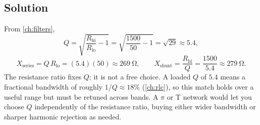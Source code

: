 \subsection*{Solution}
From \cref{ch:filters},
\[
Q=\sqrt{\frac{R_{\text{hi}}}{R_{\text{lo}}}-1}=\sqrt{\frac{1500}{50}-1}=\sqrt{29}\approx5.4,
\]
\[
X_{\text{series}}=Q\,R_{\text{lo}}=(5.4)(50)\approx\SI{269}{\ohm},
\qquad
X_{\text{shunt}}=\frac{R_{\text{hi}}}{Q}=\frac{1500}{5.4}\approx\SI{279}{\ohm}.
\]
The resistance ratio fixes \(Q\); it is not a free choice. A loaded
\(Q\) of \(5.4\) means a fractional bandwidth of roughly \(1/Q\approx18\%\)
(\cref{ch:rlc}), so this match holds over a useful range but must be retuned across
bands. A \(\pi\) or T network would let you choose \(Q\) independently of the
resistance ratio, buying either wider bandwidth or sharper harmonic rejection as
needed.
